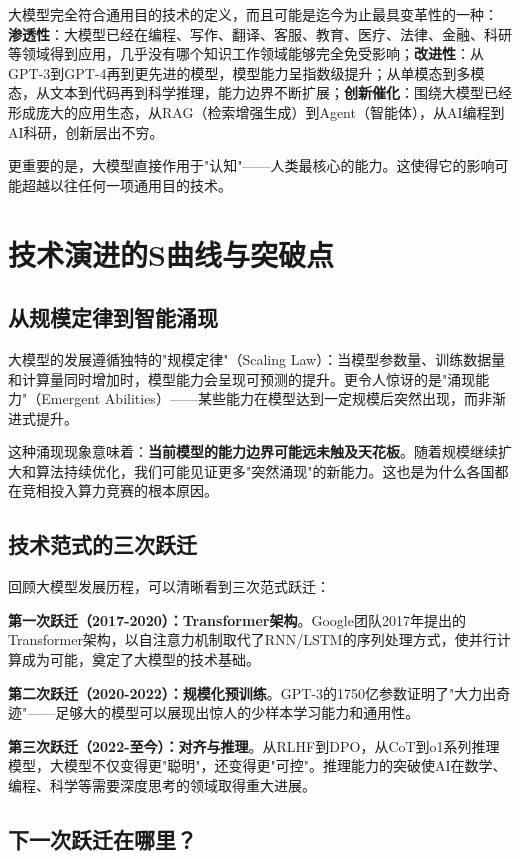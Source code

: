 大模型完全符合通用目的技术的定义，而且可能是迄今为止最具变革性的一种：
\textbf{渗透性}：大模型已经在编程、写作、翻译、客服、教育、医疗、法律、金融、科研等领域得到应用，几乎没有哪个知识工作领域能够完全免受影响；\textbf{改进性}：从GPT-3到GPT-4再到更先进的模型，模型能力呈指数级提升；从单模态到多模态，从文本到代码再到科学推理，能力边界不断扩展；\textbf{创新催化}：围绕大模型已经形成庞大的应用生态，从RAG（检索增强生成）到Agent（智能体），从AI编程到AI科研，创新层出不穷。

更重要的是，大模型直接作用于"认知"——人类最核心的能力。这使得它的影响可能超越以往任何一项通用目的技术。

\section{技术演进的S曲线与突破点}

\subsection{从规模定律到智能涌现}

大模型的发展遵循独特的"规模定律"（Scaling Law）：当模型参数量、训练数据量和计算量同时增加时，模型能力会呈现可预测的提升。更令人惊讶的是"涌现能力"（Emergent Abilities）——某些能力在模型达到一定规模后突然出现，而非渐进式提升。

这种涌现现象意味着：\textbf{当前模型的能力边界可能远未触及天花板}。随着规模继续扩大和算法持续优化，我们可能见证更多"突然涌现"的新能力。这也是为什么各国都在竞相投入算力竞赛的根本原因。

\subsection{技术范式的三次跃迁}

回顾大模型发展历程，可以清晰看到三次范式跃迁：

\textbf{第一次跃迁（2017-2020）：Transformer架构}。Google团队2017年提出的Transformer架构，以自注意力机制取代了RNN/LSTM的序列处理方式，使并行计算成为可能，奠定了大模型的技术基础。

\textbf{第二次跃迁（2020-2022）：规模化预训练}。GPT-3的1750亿参数证明了"大力出奇迹"——足够大的模型可以展现出惊人的少样本学习能力和通用性。

\textbf{第三次跃迁（2022-至今）：对齐与推理}。从RLHF到DPO，从CoT到o1系列推理模型，大模型不仅变得更"聪明"，还变得更"可控"。推理能力的突破使AI在数学、编程、科学等需要深度思考的领域取得重大进展。

\subsection{下一次跃迁在哪里？}

